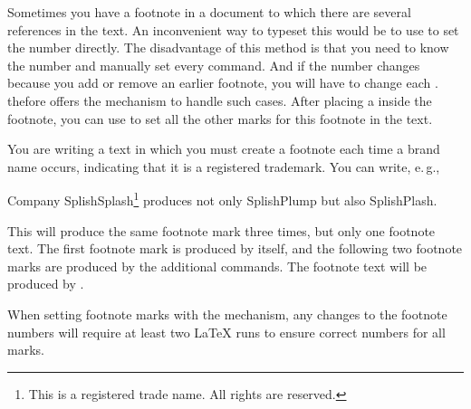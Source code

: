 \begin{Declaration}
\end{Declaration}
Sometimes you have a footnote in a document to which there are several references
in the text. An inconvenient way to typeset this would be to use
 to set the number directly.
The disadvantage of this method is that you need to know the number and
manually set every  command.
And if the number changes because you add or remove an earlier footnote, you
will have to change each .
\KOMAScript{} thefore offers the %
 mechanism to handle such cases. After placing a
 inside the footnote, you can use  to set all the
other marks for this footnote in the text.
\IfThisCommonFirstRun{\iftrue}{\csname iffalse\endcsname}%
  \begin{Example}
    You are writing a text in which you must create a footnote each time a
    brand name occurs, indicating that it is a registered trademark. You can
    write, e.\,g.,
\begin{lstcode}
  Company SplishSplash\footnote{This is a registered trade name.
    All rights are reserved.\label{refnote}}
  produces not only SplishPlump
  but also SplishPlash.
\end{lstcode}
    This will produce the same footnote mark three times, but only one
    footnote text. The first footnote mark is produced by
     itself, and the following two
    footnote marks are produced by the additional 
    commands. The footnote text will be produced by
    . 
  \end{Example}
  \fi When setting footnote marks with the  mechanism, any
  changes to the footnote numbers will require at least two \LaTeX{} runs to
  ensure correct numbers for all  marks.%
\EndIndexGroup


